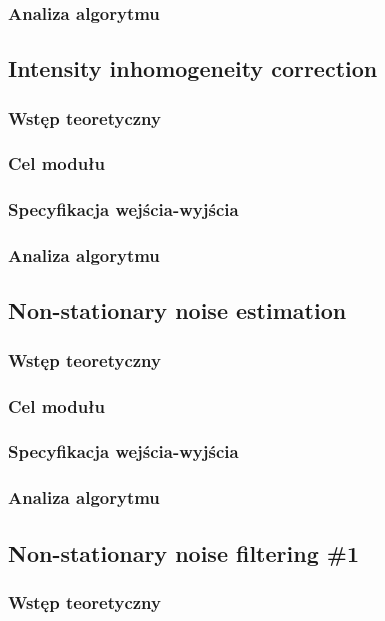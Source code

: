 \documentclass[12]{article}
\begin{document}
		\subsubsection{Analiza algorytmu}
		\newpage
	\subsection{Intensity inhomogeneity correction}
		\subsubsection{Wstęp teoretyczny}
		\subsubsection{Cel modułu}
		\subsubsection{Specyfikacja wejścia-wyjścia}
		\subsubsection{Analiza algorytmu}
		\newpage
	\subsection{Non-stationary noise estimation}
		\subsubsection{Wstęp teoretyczny}
		\subsubsection{Cel modułu}
		\subsubsection{Specyfikacja wejścia-wyjścia}
		\subsubsection{Analiza algorytmu}
		\newpage
	\subsection{Non-stationary noise filtering \#1}
		\subsubsection{Wstęp teoretyczny}
\end{document}
